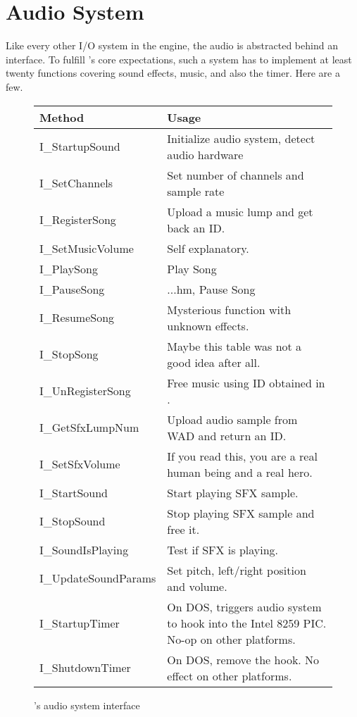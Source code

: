 \section{Audio System}
\label{dmx_section}
Like every other I/O system in the engine, the audio is abstracted behind an interface. To fulfill \doom's core expectations, such a system has to implement at least twenty functions covering sound effects, music, and also the timer. Here are a few.\\
\par
 \begin{figure}[H]
\centering  
\begin{tabularx}{\textwidth}{ L{0.57}  L{1.43}}
  \toprule
  \textbf{Method} &  \textbf{Usage}\\

  \toprule 
  I\_StartupSound & Initialize audio system, detect audio hardware\\
  I\_SetChannels & Set number of channels and sample rate\\
  \toprule 
   
I\_RegisterSong & Upload a music lump and get back an ID.\\
I\_SetMusicVolume & Self explanatory.\\
I\_PlaySong & Play Song\\
I\_PauseSong & ...hm, Pause Song\\
I\_ResumeSong & Mysterious function with unknown effects.\\
I\_StopSong & Maybe this table was not a good idea after all.\\
I\_UnRegisterSong & Free music using ID obtained in .\\




  \toprule 
I\_GetSfxLumpNum & Upload audio sample from WAD and return an ID.\\
I\_SetSfxVolume & If you read this, you are a real human being and a real hero.\\
I\_StartSound & Start playing SFX sample.\\
I\_StopSound & Stop playing SFX sample and free it.\\
I\_SoundIsPlaying & Test if SFX is playing.\\
I\_UpdateSoundParams & Set pitch, left/right position and volume.\\

  \toprule 
  
I\_StartupTimer & On DOS, triggers audio system to hook into the Intel 8259 PIC. No-op on other platforms.\\
I\_ShutdownTimer & On DOS, remove the hook.  No effect on other platforms.\\

   \toprule
\end{tabularx}
\caption{\doom{}'s audio system interface}
\end{figure}



